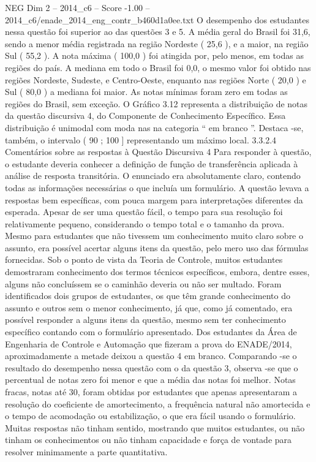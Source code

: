 \begin{textsample}{NEG Dim 2 – 2014\_c6 – Score -1.00 – 2014\_c6/enade\_2014\_eng\_contr\_b460d1a0ee.txt}
O desempenho dos estudantes nessa questão foi superior ao das questões 3 e 5.
A média geral do Brasil foi 31,6, sendo a menor média registrada na região Nordeste ( 25,6 ), e a maior, na região Sul ( 55,2 ).
A nota máxima ( 100,0 ) foi atingida por, pelo menos, em todas as regiões do país.
A mediana em todo o Brasil foi 0,0, o mesmo valor foi obtido nas regiões Nordeste, Sudeste, e Centro-Oeste, enquanto nas regiões Norte ( 20,0 ) e Sul ( 80,0 ) a mediana foi maior.
As notas mínimas foram zero em todas as regiões do Brasil, sem exceção.
O Gráfico 3.12 representa a distribuição de notas da questão discursiva 4, do Componente de Conhecimento Específico.
Essa distribuição é unimodal com moda nas na categoria “ em branco ”.
Destaca -se, também, o intervalo ( 90 ; 100 ] representando um máximo local. 3.3.2.4 Comentários sobre as respostas à Questão Discursiva 4 Para responder à questão, o estudante deveria conhecer a definição de função de transferência aplicada à análise de resposta transitória.
O enunciado era absolutamente claro, contendo todas as informações necessárias o que incluía um formulário.
A questão levava a respostas bem específicas, com pouca margem para interpretações diferentes da esperada.
Apesar de ser uma questão fácil, o tempo para sua resolução foi relativamente pequeno, considerando o tempo total e o tamanho da prova.
Mesmo para estudantes que não tivessem um conhecimento muito claro sobre o assunto, era possível acertar alguns itens da questão, pelo mero uso das fórmulas fornecidas.
Sob o ponto de vista da Teoria de Controle, muitos estudantes demostraram conhecimento dos termos técnicos específicos, embora, dentre esses, alguns não concluíssem se o caminhão deveria ou não ser multado.
Foram identificados dois grupos de estudantes, os que têm grande conhecimento do assunto e outros sem o menor conhecimento, já que, como já comentado, era possível responder a alguns itens da questão, mesmo sem ter conhecimento específico contando com o formulário apresentado.
Dos estudantes da Área de Engenharia de Controle e Automação que fizeram a prova do ENADE/2014, aproximadamente a metade deixou a questão 4 em branco.
Comparando -se o resultado do desempenho nessa questão com o da questão 3, observa -se que o percentual de notas zero foi menor e que a média das notas foi melhor.
Notas fracas, notas até 30, foram obtidas por estudantes que apenas apresentaram a resolução do coeficiente de amortecimento, a frequência natural não amortecida e o tempo de acomodação ou estabilização, o que era fácil usando o formulário.
Muitas respostas não tinham sentido, mostrando que muitos estudantes, ou não tinham os conhecimentos ou não tinham capacidade e força de vontade para resolver minimamente a parte quantitativa.

\end{textsample}
